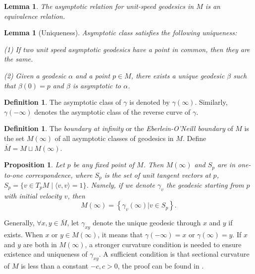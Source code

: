 \documentclass[reqno]{amsart}
\newtheorem{lemma}[theorem]{Lemma}
\newtheorem{proposition}[theorem]{Proposition}
\theoremstyle{remark}
\theoremstyle{definition}
\newtheorem{definition}[theorem]{Definition}
\numberwithin{equation}{section}
\begin{document}
\begin{lemma}
    The asymptotic relation for unit-speed geodesics in $M$ is an equivalence relation.
\end{lemma}


\begin{lemma}[Uniqueness]
    Asymptotic class satisfies the following uniqueness:

    \textup{(1)} If two unit speed asymptotic geodesics have a point in common, then they are the same. 

    \textup{(2)} Given a geodesic $\alpha$ and a point $p \in M$, there exists a unique geodesic $\beta$ such that $\beta(0) = p$ and $\beta$ is asymptotic to $\alpha$.
\end{lemma}

\begin{definition}
    The asymptotic class of $\gamma$ is denoted by $\gamma (\infty)$. Similarly, $\gamma (-\infty)$ denotes the asymptotic class of the reverse curve of $\gamma$.
\end{definition}

\begin{definition}
    The \textit{boundary at infinity} or the \textit{Eberlein-O'Neill boundary} \cite{Visibilitymanifolds} of $M$ is the set $M(\infty)$ of all asymptotic classes of geodesics in $M$. Define $\overline{M} = M \sqcup M(\infty)$.
\end{definition}

\begin{proposition}
    Let $p$ be any fixed point of $M$. Then $M(\infty)$ and $S_p$ are in one-to-one correspondence, where $S_p$ is the set of unit tangent vectors at $p$, $S_p = \{v \in T_p M \mid \langle v, v \rangle = 1\}$. Namely, if we denote $\gamma_v$ the geodesic starting from $p$ with initial velocity $v$, then
    \[
    M(\infty) = \left\{ \gamma_v(\infty) | v \in S_p \right\}.
    \]
\end{proposition}

Generally, $\forall x,y \in \overline{M}$, let $\gamma_{xy}$ denote the unique geodesic through $x$ and $y$ if exists. When $x$ or $y \in M(\infty)$, it means that $\gamma (-\infty) = x$ or $\gamma (\infty) = y$. If $x$ and $y$ are both in $M(\infty)$, a stronger curvature condition is needed to ensure existence and uniqueness of $\gamma_{xy}$. A sufficient condition is that sectional curvature of $M$ is less than a constant $-c, c>0$, the proof can be found in \cite{Visibilitymanifolds}.
\end{document}
